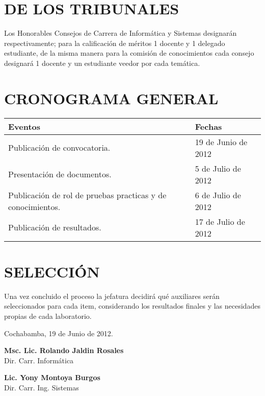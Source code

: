 \documentclass[letterpaper,11pt]{article}
\begin{document}
\section{DE LOS TRIBUNALES}
Los Honorables Consejos de Carrera de Informática y Sistemas designarán respectivamente; para la calificación de méritos 1 docente y 1 delegado estudiante, de la misma manera para la comisión de conocimientos cada consejo designará 1 docente y un estudiante veedor por cada temática.

\section{CRONOGRAMA GENERAL}
\begin{tabular}{|l|l|}
\hline
 \textbf{Eventos} & \textbf{Fechas} \\
\hline
 Publicación de convocatoria. & 19 de Junio de 2012 \\
\hline
 Presentación de documentos. & 5 de Julio de 2012 \\
\hline
 Publicación de rol de pruebas practicas y de conocimientos. & 6 de Julio de 2012 \\
\hline
 Publicación de resultados. & 17 de Julio de 2012 \\
\hline
\end{tabular}

\section{SELECCIÓN}
Una vez concluido el proceso la jefatura decidirá qué auxiliares serán seleccionados para cada item, considerando los resultados finales y las necesidades propias de cada laboratorio.

\vspace{4cm}

\begin{center}
Cochabamba, 19 de Junio de 2012.
\end{center}

\vspace{4cm}

\begin{minipage}[b]{0.5\textwidth}
\begin{center}
{\bf Msc. Lic. Rolando Jaldin Rosales}\\
Dir. Carr. Informática\\
\end{center}
\end{minipage}
\begin{minipage}[b]{0.5\textwidth}
\begin{center}
{\bf Lic. Yony Montoya Burgos}\\
Dir. Carr. Ing. Sistemas\\
\end{center}
\end{minipage}
\end{document}
